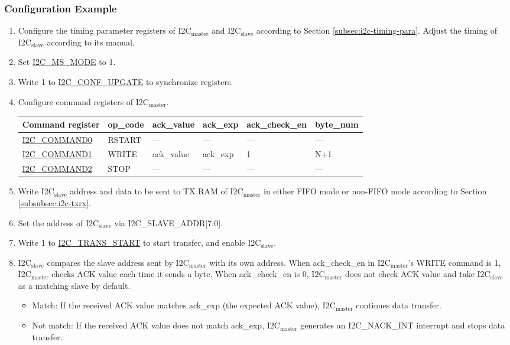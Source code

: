 \documentclass[main\_\_EN.tex]{subfiles}
\begin{document}
\subsubsection{Configuration Example}
\begin{enumerate}

\item Configure the timing parameter registers of I2C$_\text{master}$ and I2C$_\text{slave}$ according to Section \ref{subsec:i2c-timing-para}. Adjust the timing of I2C$_\text{slave}$ according to its manual.
\item Set \hyperref[fielddesc:I2CMSMODE]{I2C\_MS\_MODE}  to 1.
\item Write 1 to \hyperref[fielddesc:I2CCONFUPGATE]{I2C\_CONF\_UPGATE} to synchronize registers.
\item Configure command registers of I2C$_\text{master}$.
\begin{longtable}{ | p{4cm} | p{2cm} | p{2cm} | p{2cm} |p{2cm} | p{2cm} |}
\hline\rowcolor{lightgray}
Command register& op\_code & ack\_value&ack\_exp&ack\_check\_en&byte\_num  \\ \hline
\hyperref[fielddesc:I2CCOMMAND0]{I2C\_COMMAND0} & RSTART& ---&---&---&---  \\ \hline
\hyperref[fielddesc:I2CCOMMAND1]{I2C\_COMMAND1} & WRITE& ack\_value&ack\_exp&1&N+1  \\ \hline
\hyperref[fielddesc:I2CCOMMAND2]{I2C\_COMMAND2} & STOP& ---&---&---&---  \\ \hline
\end{longtable}
\item Write I2C$_\text{slave}$ address and data to be sent to TX RAM of I2C$_\text{master}$ in either FIFO mode or non-FIFO mode according to Section \ref{subsubsec:i2c-txrx}.
\item Set the address of I2C$_\text{slave}$ via I2C\_SLAVE\_ADDR[7:0].
\item Write 1 to \hyperref[fielddesc:I2CTRANSSTART]{I2C\_TRANS\_START} to start transfer, and enable I2C$_\text{slave}$.
\item I2C$_\text{slave}$ compares the slave address sent by I2C$_\text{master}$ with its own address. When ack\_check\_en in I2C$_\text{master}$'s WRITE command is 1, I2C$_\text{master}$ checks ACK value each time it sends a byte. When ack\_check\_en  is 0, I2C$_\text{master}$ does not check ACK value and take I2C$_\text{slave}$ as a matching slave by default.
\begin{itemize}
\item Match: If the received ACK value matches ack\_exp (the expected ACK value), I2C$_\text{master}$ continues data transfer.
\item Not match: If the received ACK value does not match ack\_exp, I2C$_\text{master}$ generates an I2C\_NACK\_INT  interrupt and stops data transfer.
\end{itemize}


\end{enumerate}
\end{document}
